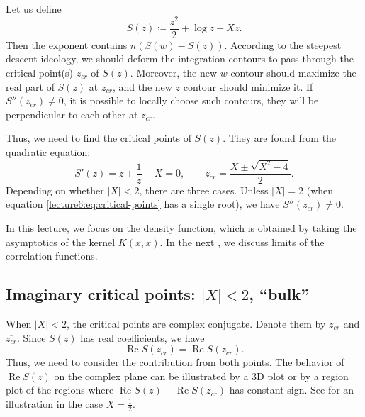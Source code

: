 \documentclass[letterpaper,11pt,oneside,reqno]{book}
\numberwithin{equation}{chapter}  %
\theoremstyle{definition}
\begin{document}
Let us define
\begin{equation*}
	S(z)\coloneqq
	\frac{z^2}{2}+\log z -X z.
\end{equation*}
Then the exponent contains $n \left( S(w)-S(z) \right)$.
According to the steepest descent ideology, we
should deform the integration contours
to pass through the critical point(s) $z_{cr}$ of $S(z)$.
Moreover, the new $w$ contour should maximize the real part of $S(z)$
at $z_{cr}$, and the new $z$ contour should minimize it.
If $S''(z_{cr})\ne 0$, it is possible to locally choose such contours,
they will be perpendicular to each other at $z_{cr}$.

Thus, we need to find the critical points of $S(z)$.
They are found from the quadratic equation:
\begin{equation}
	\label{lecture6:eq:critical-points}
	S'(z)=z+\frac{1}{z}-X=0,\qquad
	z_{cr}=\frac{X\pm \sqrt{X^2-4}}{2}.
\end{equation}
Depending on whether $|X|<2$, there are three cases.
Unless $|X|=2$ (when equation \eqref{lecture6:eq:critical-points} has a single root), we have
$S''(z_{cr})\ne 0$.

In this lecture, we focus on the density function, which is obtained by taking the asymptotics of the
kernel $K(x,x)$. In the next ,
we discuss limits of the correlation functions.

\subsection{Imaginary critical points: \texorpdfstring{$|X|<2$, ``bulk''}{|X|<2, bulk}}
\label{lecture6:sub:imaginary-critical-points}

When $|X|<2$, the critical points are complex conjugate.
Denote them by $z_{cr}$ and $\overline{z_{cr}}$.
Since $S(z)$ has real coefficients, we have
\begin{equation*}
	\operatorname{Re}S(z_{cr})=\operatorname{Re}S(\overline{z_{cr}}).
\end{equation*}
Thus, we need to consider the contribution from both points.
The behavior of $\operatorname{Re}S(z)$ on the complex plane
can be illustrated by a 3D plot or by a region plot of the regions
where $\operatorname{Re}S(z)-\operatorname{Re}S(z_{cr})$ has constant sign.
See  for an illustration in the case $X=\frac{1}{2}$.
\end{document}
